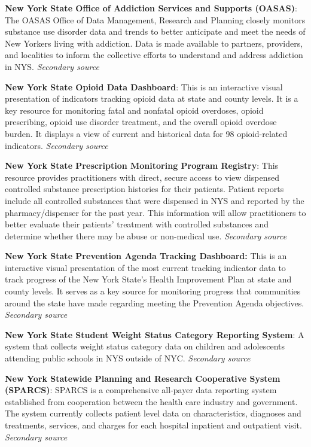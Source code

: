 \documentclass[
  english,
  letterpaper,
]{report}
\begin{document}
\textbf{New York State Office of Addiction Services and Supports
(OASAS)}: The OASAS Office of Data Management, Research and Planning
closely monitors substance use disorder data and trends to better
anticipate and meet the needs of New Yorkers living with addiction. Data
is made available to partners, providers, and localities to inform the
collective efforts to understand and address addiction in NYS.
\emph{Secondary source}

\textbf{New York State Opioid Data Dashboard}: This is an interactive
visual presentation of indicators tracking opioid data at state and
county levels. It is a key resource for monitoring fatal and nonfatal
opioid overdoses, opioid prescribing, opioid use disorder treatment, and
the overall opioid overdose burden. It displays a view of current and
historical data for 98 opioid-related indicators. \emph{Secondary
source}

\textbf{New York State Prescription Monitoring Program Registry}: This
resource provides practitioners with direct, secure access to view
dispensed controlled substance prescription histories for their
patients. Patient reports include all controlled substances that were
dispensed in NYS and reported by the pharmacy/dispenser for the past
year. This information will allow practitioners to better evaluate their
patients' treatment with controlled substances and determine whether
there may be abuse or non-medical use. \emph{Secondary source}

\textbf{New York State Prevention Agenda Tracking Dashboard:} This is an
interactive visual presentation of the most current tracking indicator
data to track progress of the New York State's Health Improvement Plan
at state and county levels. It serves as a key source for monitoring
progress that communities around the state have made regarding meeting
the Prevention Agenda objectives. \emph{Secondary source}

\textbf{New York State Student Weight Status Category Reporting System}:
A system that collects weight status category data on children and
adolescents attending public schools in NYS outside of NYC.
\emph{Secondary source}

\textbf{New York Statewide Planning and Research Cooperative System
(SPARCS)}: SPARCS is a comprehensive all-payer data reporting system
established from cooperation between the health care industry and
government. The system currently collects patient level data on
characteristics, diagnoses and treatments, services, and charges for
each hospital inpatient and outpatient visit. \emph{Secondary source}
\end{document}
